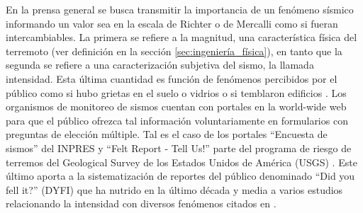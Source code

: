 \documentclass[a4paper]{report}
\begin{document}
%
%

En la prensa general se busca transmitir la importancia de un fenómeno sísmico informando un valor sea en la escala de Richter o de Mercalli como si fueran intercambiables.
La primera se refiere a la magnitud, una característica física del terremoto (ver definición en la sección \ref{sec:ingeniería_física}), en tanto que la segunda se refiere a una caracterización subjetiva del sismo, la llamada intensidad.
Esta última cuantidad es función de fenómenos percibidos por el público como si hubo grietas en el suelo o vidrios o si temblaron edificios \cite[sección 4.2.3]{fowler_solid_1990}.
Los organismos de monitoreo de sismos cuentan con portales en la world-wide web para que el público ofrezca tal información voluntariamente en formularios con preguntas de elección múltiple.
Tal es el caso de los portales ``Encuesta de sismos'' del INPRES \cite{noauthor_encuesta_nodate} y ``Felt Report - Tell Us!'' \cite{noauthor_felt_nodate} parte del programa de riesgo de terremos del Geological Survey de los Estados Unidos de América (USGS) \cite{david_jay_usgs_2012}. 
Este último aporta a la sistematización de reportes del público denominado ``Did you fell it?'' (DYFI) que ha nutrido en la último década y media a varios estudios relacionando la intensidad con diversos fenómenos citados en \cite{noauthor_dyfi_nodate}.
\end{document}
